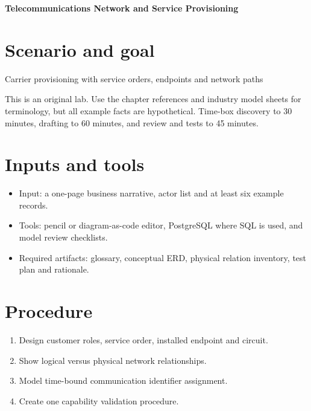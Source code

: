 \documentclass[11pt,letterpaper]{article}
\begin{document}
\begin{center}
{\LARGE\bfseries\color{navy} Telecommunications Network and Service Provisioning}\par
\vspace{0.25em}{\large Practical modeling laboratory}\par
{}
\end{center}
\vspace{0.8em}
\section{Scenario and goal}
Carrier provisioning with service orders, endpoints and network paths

This is an original lab. Use the chapter references and industry model sheets for terminology, but all example facts are hypothetical. Time-box discovery to 30 minutes, drafting to 60 minutes, and review and tests to 45 minutes.


\section{Inputs and tools}
\begin{itemize}
\item Input: a one-page business narrative, actor list and at least six example records.
\item Tools: pencil or diagram-as-code editor, PostgreSQL where SQL is used, and model review checklists.
\item Required artifacts: glossary, conceptual ERD, physical relation inventory, test plan and rationale.
\end{itemize}

\section{Procedure}
\begin{enumerate}
\item Design customer roles, service order, installed endpoint and circuit.
\item Show logical versus physical network relationships.
\item Model time-bound communication identifier assignment.
\item Create one capability validation procedure.
\end{enumerate}
\end{document}
